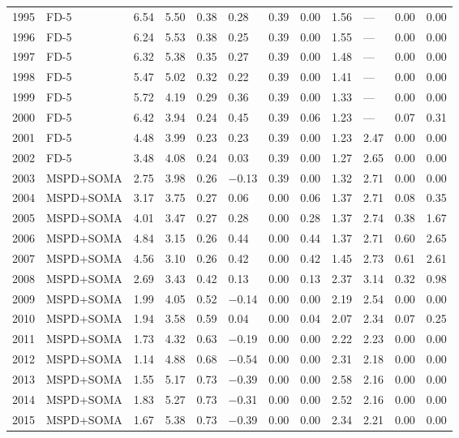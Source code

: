 {\begin{longtable}{llllllllllll}
1995 & FD-5 & 6.54 & 5.50 & 0.38 & 0.28 & 0.39 & 0.00 & 1.56 & — & 0.00 & 0.00 \\
1996 & FD-5 & 6.24 & 5.53 & 0.38 & 0.25 & 0.39 & 0.00 & 1.55 & — & 0.00 & 0.00 \\
1997 & FD-5 & 6.32 & 5.38 & 0.35 & 0.27 & 0.39 & 0.00 & 1.48 & — & 0.00 & 0.00 \\
1998 & FD-5 & 5.47 & 5.02 & 0.32 & 0.22 & 0.39 & 0.00 & 1.41 & — & 0.00 & 0.00 \\
1999 & FD-5 & 5.72 & 4.19 & 0.29 & 0.36 & 0.39 & 0.00 & 1.33 & — & 0.00 & 0.00 \\
2000 & FD-5 & 6.42 & 3.94 & 0.24 & 0.45 & 0.39 & 0.06 & 1.23 & — & 0.07 & 0.31 \\
2001 & FD-5 & 4.48 & 3.99 & 0.23 & 0.23 & 0.39 & 0.00 & 1.23 & 2.47 & 0.00 & 0.00 \\
2002 & FD-5 & 3.48 & 4.08 & 0.24 & 0.03 & 0.39 & 0.00 & 1.27 & 2.65 & 0.00 & 0.00 \\
2003 & MSPD+SOMA & 2.75 & 3.98 & 0.26 & $-$0.13 & 0.39 & 0.00 & 1.32 & 2.71 & 0.00 & 0.00 \\
2004 & MSPD+SOMA & 3.17 & 3.75 & 0.27 & 0.06 & 0.00 & 0.06 & 1.37 & 2.71 & 0.08 & 0.35 \\
2005 & MSPD+SOMA & 4.01 & 3.47 & 0.27 & 0.28 & 0.00 & 0.28 & 1.37 & 2.74 & 0.38 & 1.67 \\
2006 & MSPD+SOMA & 4.84 & 3.15 & 0.26 & 0.44 & 0.00 & 0.44 & 1.37 & 2.71 & 0.60 & 2.65 \\
2007 & MSPD+SOMA & 4.56 & 3.10 & 0.26 & 0.42 & 0.00 & 0.42 & 1.45 & 2.73 & 0.61 & 2.61 \\
2008 & MSPD+SOMA & 2.69 & 3.43 & 0.42 & 0.13 & 0.00 & 0.13 & 2.37 & 3.14 & 0.32 & 0.98 \\
2009 & MSPD+SOMA & 1.99 & 4.05 & 0.52 & $-$0.14 & 0.00 & 0.00 & 2.19 & 2.54 & 0.00 & 0.00 \\
2010 & MSPD+SOMA & 1.94 & 3.58 & 0.59 & 0.04 & 0.00 & 0.04 & 2.07 & 2.34 & 0.07 & 0.25 \\
2011 & MSPD+SOMA & 1.73 & 4.32 & 0.63 & $-$0.19 & 0.00 & 0.00 & 2.22 & 2.23 & 0.00 & 0.00 \\
2012 & MSPD+SOMA & 1.14 & 4.88 & 0.68 & $-$0.54 & 0.00 & 0.00 & 2.31 & 2.18 & 0.00 & 0.00 \\
2013 & MSPD+SOMA & 1.55 & 5.17 & 0.73 & $-$0.39 & 0.00 & 0.00 & 2.58 & 2.16 & 0.00 & 0.00 \\
2014 & MSPD+SOMA & 1.83 & 5.27 & 0.73 & $-$0.31 & 0.00 & 0.00 & 2.52 & 2.16 & 0.00 & 0.00 \\
2015 & MSPD+SOMA & 1.67 & 5.38 & 0.73 & $-$0.39 & 0.00 & 0.00 & 2.34 & 2.21 & 0.00 & 0.00 \\

\end{longtable}}

